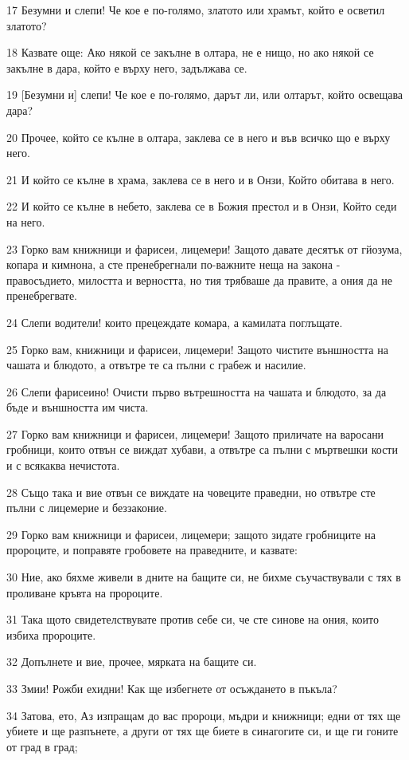 \par 17 Безумни и слепи! Че кое е по-голямо, златото или храмът, който е осветил златото?
\par 18 Казвате още: Ако някой се закълне в олтара, не е нищо, но ако някой се закълне в дара, който е върху него, задължава се.
\par 19 [Безумни и] слепи! Че кое е по-голямо, дарът ли, или олтарът, който освещава дара?
\par 20 Прочее, който се кълне в олтара, заклева се в него и във всичко що е върху него.
\par 21 И който се кълне в храма, заклева се в него и в Онзи, Който обитава в него.
\par 22 И който се кълне в небето, заклева се в Божия престол и в Онзи, Който седи на него.
\par 23 Горко вам книжници и фарисеи, лицемери! Защото давате десятък от гйозума, копара и кимнона, а сте пренебрегнали по-важните неща на закона - правосъдието, милостта и верността, но тия трябваше да правите, а ония да не пренебрегвате.
\par 24 Слепи водители! които прецеждате комара, а камилата поглъщате.
\par 25 Горко вам, книжници и фарисеи, лицемери! Защото чистите външността на чашата и блюдото, а отвътре те са пълни с грабеж и насилие.
\par 26 Слепи фарисеино! Очисти първо вътрешността на чашата и блюдото, за да бъде и външността им чиста.
\par 27 Горко вам книжници и фарисеи, лицемери! Защото приличате на варосани гробници, които отвън се виждат хубави, а отвътре са пълни с мъртвешки кости и с всякаква нечистота.
\par 28 Също така и вие отвън се виждате на човеците праведни, но отвътре сте пълни с лицемерие и беззаконие.
\par 29 Горко вам книжници и фарисеи, лицемери; защото зидате гробниците на пророците, и поправяте гробовете на праведните, и казвате:
\par 30 Ние, ако бяхме живели в дните на бащите си, не бихме съучаствували с тях в проливане кръвта на пророците.
\par 31 Така щото свидетелствувате против себе си, че сте синове на ония, които избиха пророците.
\par 32 Допълнете и вие, прочее, мярката на бащите си.
\par 33 Змии! Рожби ехидни! Как ще избегнете от осъждането в пъкъла?
\par 34 Затова, ето, Аз изпращам до вас пророци, мъдри и книжници; едни от тях ще убиете и ще разпънете, а други от тях ще биете в синагогите си, и ще ги гоните от град в град;
